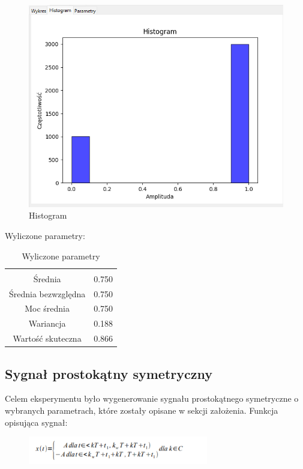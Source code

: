 \documentclass{article}
\begin{document}
\begin{figure}[h!]
    \centering
    \includegraphics[width=\textwidth]{img/prostokat/hist.png}
    \caption{Histogram}
\end{figure}
\FloatBarrier
Wyliczone parametry:
\begin{table}[h!]
    \centering
    \vspace{0.2cm}
    \begin{tabular}{|c|c|}
        \hline\hline\\[-0.4cm]
        Średnia & 0.750  \\
        \hline
        Średnia bezwzględna & 0.750  \\
        \hline
        Moc średnia & 0.750  \\
        \hline
        Wariancja & 0.188 \\
        \hline
        Wartość skuteczna & 0.866 \\
        \hline
    \end{tabular}
    \caption{Wyliczone parametry}
    \label{prostokat}
\end{table}

\subsection{Sygnał prostokątny symetryczny} \label{prostokatsymetryczny} 
Celem eksperymentu było wygenerowanie sygnału prostokątnego symetryczne o wybranych parametrach,
które zostały opisane w sekcji założenia. Funkcja opisująca sygnał:

\begin{figure}[!htbp]
    \centering
    \includegraphics[width=0.7\textwidth]{img/prostokatsymet.png}
\end{figure}
\end{document}
